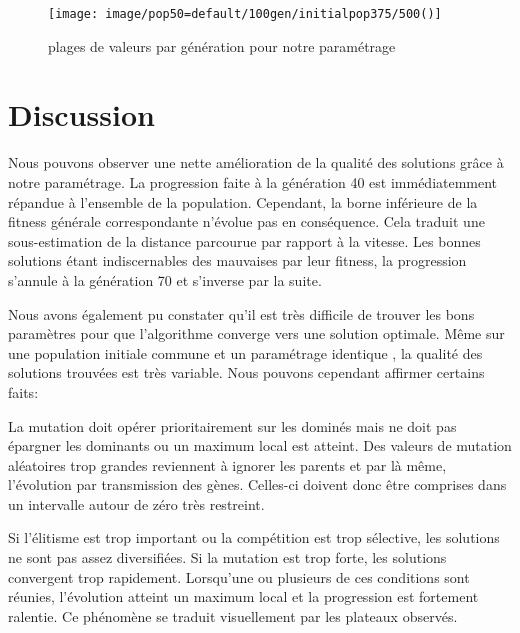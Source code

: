 \documentclass[journal, a4paper]{IEEEtran}
\begin{document}
\begin{figure}[!hbt]
  \texttt{[image: image/pop50=default/100gen/initialpop375/500()]}
  \caption{plages de valeurs par génération pour notre paramétrage}
  \label{fig:300tournament14elit2()}
\end{figure}


\section{Discussion}
	Nous pouvons observer une nette amélioration de la qualité des solutions
	grâce à notre paramétrage.
	La progression faite à la génération 40 est immédiatemment répandue
	à l'ensemble de la population.
	Cependant, la borne inférieure de la fitness générale
	correspondante n'évolue pas en conséquence.
	Cela traduit une sous-estimation de la distance parcourue par
	rapport à la vitesse.
	Les bonnes solutions étant indiscernables des mauvaises par leur fitness,
	la progression s'annule à la génération 70 et s'inverse par la suite.

	Nous avons également pu constater qu'il est très difficile
	de trouver les bons paramètres pour que l'algorithme converge
	vers une solution optimale.
	Même sur une population initiale commune et un paramétrage identique
	, la qualité des solutions trouvées est très variable.
	Nous pouvons cependant affirmer certains faits:

	La mutation doit opérer prioritairement sur les dominés mais
	ne doit pas épargner les dominants ou un maximum local est atteint.
	Des valeurs de mutation aléatoires trop grandes reviennent à
	ignorer les parents et par là même, l'évolution par transmission
	des gènes.
	Celles-ci doivent donc être comprises dans un
	intervalle autour de zéro très restreint.

	Si l'élitisme est trop important ou la compétition est trop sélective,
	les solutions
	ne sont pas assez diversifiées.
	Si la mutation est trop forte, les solutions convergent trop rapidement.
	Lorsqu'une ou plusieurs de ces conditions sont réunies, l'évolution
	atteint un maximum local et la progression est fortement ralentie.
	Ce phénomène se traduit visuellement par les plateaux observés.
\end{document}
